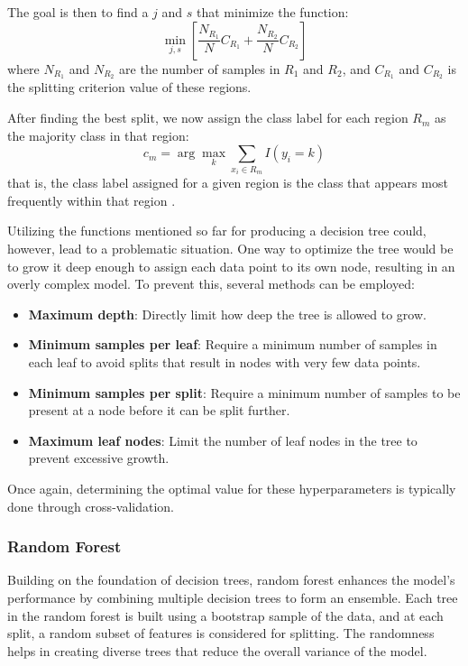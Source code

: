 \documentclass[english,11pt,a4paper,titlepage]{article}
\begin{document}
	The goal is then to find a \( j \) and \( s \) that minimize the function:
	\begin{equation*}
		\min_{j,s} \left[\frac{N_{R_1}}{N}C_{R_1} + \frac{N_{R_2}}{N}C_{R_2}\right]
	\end{equation*}
	where \( N_{R_1} \) and \( N_{R_2} \) are the number of samples in \( R_1 \) and \( R_2 \), and \( C_{R_1} \) and \( C_{R_2} \) is the splitting criterion value of these regions.
	
	After finding the best split, we now assign the class label for each region \( R_m \) as the majority class in that region:
	\begin{equation*}
		c_m = \arg \max_k \sum_{x_i \in R_m} I(y_i = k)
	\end{equation*}
	that is, the class label assigned for a given region is the class that appears most frequently within that region \cite{hastieElementsStatisticalLearning2009,sohilIntroductionStatisticalLearning2022}.
	
	Utilizing the functions mentioned so far for producing a decision tree could, however, lead to a problematic situation. One way to optimize the tree would be to grow it deep enough to assign each data point to its own node, resulting in an overly complex model. To prevent this, several methods can be employed:
	\begin{itemize}
		\item \textbf{Maximum depth}: Directly limit how deep the tree is allowed to grow.
		\item \textbf{Minimum samples per leaf}: Require a minimum number of samples in each leaf to avoid splits that result in nodes with very few data points.
		\item \textbf{Minimum samples per split}: Require a minimum number of samples to be present at a node before it can be split further.
		\item \textbf{Maximum leaf nodes}: Limit the number of leaf nodes in the tree to prevent excessive growth.
	\end{itemize}
	
	Once again, determining the optimal value for these hyperparameters is typically done through cross-validation.
	
	\subsubsection*{Random Forest}
	Building on the foundation of decision trees, random forest enhances the model's performance by combining multiple decision trees to form an ensemble. Each tree in the random forest is built using a bootstrap sample of the data, and at each split, a random subset of features is considered for splitting. The randomness helps in creating diverse trees that reduce the overall variance of the model.
	
\end{document}
